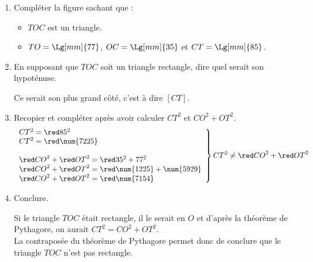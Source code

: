 \begin{corrige}
    \begin{enumerate}
        \item Compléter la figure sachant que :
        \begin{itemize}
            \item $TOC$ est un triangle.
            \item $TO=\Lg[mm]{77}$, $OC=\Lg[mm]{35}$ et $CT=\Lg[mm]{85}$.
        \end{itemize}

        \medskip
        \item En supposant que $TOC$ soit un triangle rectangle, dire quel serait son hypoténuse.
        
        {\red Ce serait son plus grand côté, c'est à dire $[CT]$.}
        \item Recopier et compléter après avoir calculer $CT^2$ et $CO^2+OT^2$.
            $$\left.\begin{array}{l}
            CT^2={\red 85^2}\\
            CT^2={\red \num{7225}}\\
            \\
            {\red CO}^2+{\red OT}^2={\red 35^2 + 77^2}\\
            {\red CO}^2+{\red OT}^2={\red \num{1225} + \num{5929}}\\
            {\red CO}^2+{\red OT}^2={\red \num{7154}}\\
            \end{array}
            \right\rbrace CT^2\neq {\red CO}^2+{\red OT}^2$$
        \item Conclure.
        
        {\red Si le triangle $TOC$ était rectangle, il le serait en $O$ et d'après la théorème de Pythagore, on aurait $CT^2=CO^2+OT^2$.\\
        La contraposée du théorème de Pythagore permet donc de conclure que le triangle $TOC$ n'est pas rectangle.}
    \end{enumerate}
\end{corrige}
    
    